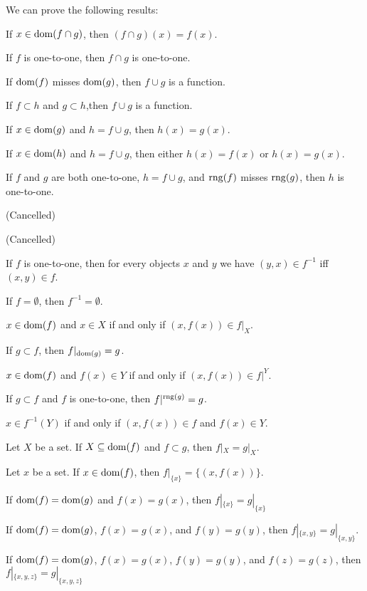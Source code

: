 \documentclass{article}
\begin{document}
We can prove the following results:
\begin{thm}
\item\label{grfunc1:11} If $x\in\operatorname{dom}(f\cap g)$, then $(f\cap g)(x)=f(x)$.
\item\label{grfunc1:12} If $f$ is one-to-one, then $f\cap g$ is one-to-one.
\item\label{grfunc1:13} If $\operatorname{dom}(f)$ misses $\operatorname{dom}(g)$, then $f\cup g$ is
  a function.
\item\label{grfunc1:14} If $f\subset h$ and $g\subset h$,then $f\cup g$
  is a function.
\item\label{grfunc1:15} If $x\in\operatorname{dom}(g)$ and $h=f\cup g$, then $h(x)=g(x)$.
\item\label{grfunc1:16} If $x\in\operatorname{dom}(h)$ and $h=f\cup g$, then either
  $h(x)=f(x)$ or $h(x)=g(x)$.
\item\label{grfunc1:17} If $f$ and $g$ are both one-to-one, $h=f\cup g$,
  and $\operatorname{rng}(f)$ misses $\operatorname{rng}(g)$, then $h$ is one-to-one.
\item\label{grfunc1:18} (Cancelled)
\item\label{grfunc1:19} (Cancelled)
\item\label{grfunc1:20} If $f$ is one-to-one, then for every objects $x$
  and $y$ we have $(y,x)\in f^{-1}$ iff $(x,y)\in f$.
\item\label{grfunc1:21} If $f=\emptyset$, then $f^{-1}=\emptyset$.
\item\label{grfunc1:22} $x\in\operatorname{dom}(f)$ and $x\in X$ if and only if
  $(x,f(x))\in f|_{X}$. 
\item\label{grfunc1:23} If $g\subset f$, then $f|_{\operatorname{dom}(g)}=g$.
\item\label{grfunc1:24} $x\in\operatorname{dom}(f)$ and $f(x)\in Y$ if and only if
  $(x,f(x))\in f|^{Y}$.
\item\label{grfunc1:25} If $g\subset f$ and $f$ is one-to-one, then $f|^{\operatorname{rng}(g)}=g$.
\item\label{grfunc1:26}  $x\in f^{-1}(Y)$ if and only if $(x,f(x))\in f$
  and $f(x)\in Y$.
\item\label{grfunc1:27} Let $X$ be a set. If $X\subseteq\operatorname{dom}(f)$ and
  $f\subset g$, then $f|_{X}=g|_{X}$.
\item\label{grfunc1:28} Let $x$ be a set. If $x\in\operatorname{dom}(f)$, then $f|_{\{x\}}=\{(x,f(x))\}$.
\item\label{grfunc1:29} If $\operatorname{dom}(f)=\operatorname{dom}(g)$ and $f(x)=g(x)$, then
  $f|_{\{x\}}=g|_{\{x\}}$
\item\label{grfunc1:30} If $\operatorname{dom}(f)=\operatorname{dom}(g)$, $f(x)=g(x)$, and
  $f(y)=g(y)$, then $f|_{\{x,y\}}=g|_{\{x,y\}}$.
\item\label{grfunc1:31} If $\operatorname{dom}(f)=\operatorname{dom}(g)$, $f(x)=g(x)$, $f(y)=g(y)$, and
  $f(z)=g(z)$, then $f|_{\{x,y,z\}}=g|_{\{x,y,z\}}$
\end{thm}
\end{document}
